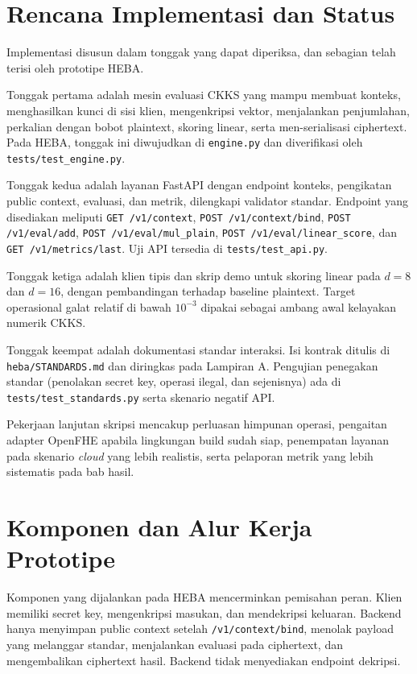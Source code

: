 \documentclass[12pt,a4paper,oneside]{report}
\begin{document}
\section{Rencana Implementasi dan Status}

Implementasi disusun dalam tonggak yang dapat diperiksa, dan sebagian telah terisi oleh prototipe HEBA.

Tonggak pertama adalah mesin evaluasi CKKS yang mampu membuat konteks, menghasilkan kunci di sisi klien, mengenkripsi vektor, menjalankan penjumlahan, perkalian dengan bobot plaintext, skoring linear, serta men-serialisasi ciphertext. Pada HEBA, tonggak ini diwujudkan di \texttt{engine.py} dan diverifikasi oleh \texttt{tests/test\_engine.py}.

Tonggak kedua adalah layanan FastAPI dengan endpoint konteks, pengikatan public context, evaluasi, dan metrik, dilengkapi validator standar. Endpoint yang disediakan meliputi \texttt{GET /v1/context}, \texttt{POST /v1/context/bind}, \texttt{POST /v1/eval/add}, \texttt{POST /v1/eval/mul\_plain}, \texttt{POST /v1/eval/linear\_score}, dan \texttt{GET /v1/metrics/last}. Uji API tersedia di \texttt{tests/test\_api.py}.

Tonggak ketiga adalah klien tipis dan skrip demo untuk skoring linear pada $d=8$ dan $d=16$, dengan pembandingan terhadap baseline plaintext. Target operasional galat relatif di bawah $10^{-3}$ dipakai sebagai ambang awal kelayakan numerik CKKS.

Tonggak keempat adalah dokumentasi standar interaksi. Isi kontrak ditulis di \texttt{heba/STANDARDS.md} dan diringkas pada Lampiran A. Pengujian penegakan standar (penolakan secret key, operasi ilegal, dan sejenisnya) ada di \texttt{tests/test\_standards.py} serta skenario negatif API.

Pekerjaan lanjutan skripsi mencakup perluasan himpunan operasi, pengaitan adapter OpenFHE apabila lingkungan build sudah siap, penempatan layanan pada skenario \emph{cloud} yang lebih realistis, serta pelaporan metrik yang lebih sistematis pada bab hasil.

\section{Komponen dan Alur Kerja Prototipe}

Komponen yang dijalankan pada HEBA mencerminkan pemisahan peran. Klien memiliki secret key, mengenkripsi masukan, dan mendekripsi keluaran. Backend hanya menyimpan public context setelah \texttt{/v1/context/bind}, menolak payload yang melanggar standar, menjalankan evaluasi pada ciphertext, dan mengembalikan ciphertext hasil. Backend tidak menyediakan endpoint dekripsi.
\end{document}
